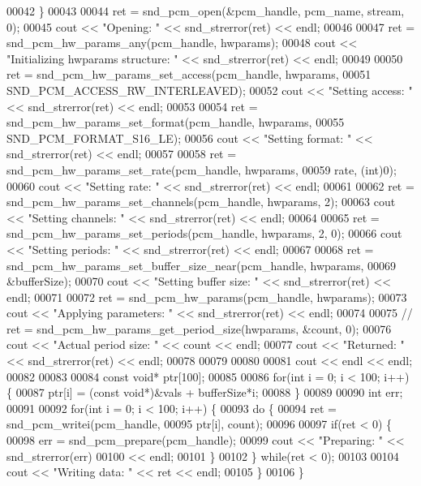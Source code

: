\begin{DoxyCode}
00042     \}
00043 
00044     ret = snd\_pcm\_open(&pcm\_handle, pcm\_name, stream, 0);
00045     cout << \textcolor{stringliteral}{"Opening: "} << snd\_strerror(ret) << endl;
00046 
00047     ret = snd\_pcm\_hw\_params\_any(pcm\_handle, hwparams);
00048     cout << \textcolor{stringliteral}{"Initializing hwparams structure: "} << snd\_strerror(ret) << endl;   
00049 
00050     ret = snd\_pcm\_hw\_params\_set\_access(pcm\_handle, hwparams,
00051             SND\_PCM\_ACCESS\_RW\_INTERLEAVED);
00052     cout << \textcolor{stringliteral}{"Setting access: "} << snd\_strerror(ret) << endl;
00053 
00054     ret = snd\_pcm\_hw\_params\_set\_format(pcm\_handle, hwparams,
00055             SND\_PCM\_FORMAT\_S16\_LE);
00056     cout << \textcolor{stringliteral}{"Setting format: "} << snd\_strerror(ret) << endl;
00057 
00058     ret = snd\_pcm\_hw\_params\_set\_rate(pcm\_handle, hwparams,
00059             rate, (\textcolor{keywordtype}{int})0);
00060     cout << \textcolor{stringliteral}{"Setting rate: "} << snd\_strerror(ret) << endl;
00061 
00062     ret = snd\_pcm\_hw\_params\_set\_channels(pcm\_handle, hwparams, 2); 
00063     cout << \textcolor{stringliteral}{"Setting channels: "} << snd\_strerror(ret) << endl;
00064 
00065     ret = snd\_pcm\_hw\_params\_set\_periods(pcm\_handle, hwparams, 2, 0);
00066     cout << \textcolor{stringliteral}{"Setting periods: "} << snd\_strerror(ret) << endl;
00067 
00068     ret = snd\_pcm\_hw\_params\_set\_buffer\_size\_near(pcm\_handle, hwparams,
00069             &bufferSize);
00070     cout << \textcolor{stringliteral}{"Setting buffer size: "} << snd\_strerror(ret) << endl;
00071 
00072     ret = snd\_pcm\_hw\_params(pcm\_handle, hwparams);
00073     cout << \textcolor{stringliteral}{"Applying parameters: "} << snd\_strerror(ret) << endl;
00074 
00075 \textcolor{comment}{//  ret = snd\_pcm\_hw\_params\_get\_period\_size(hwparams, &count, 0);}
00076     cout << \textcolor{stringliteral}{"Actual period size: "} << count << endl;
00077     cout << \textcolor{stringliteral}{"Returned: "} << snd\_strerror(ret) << endl;
00078 
00079 
00080 
00081     cout << endl << endl;
00082 
00083 
00084     \textcolor{keyword}{const} \textcolor{keywordtype}{void}* ptr[100];
00085 
00086     \textcolor{keywordflow}{for}(\textcolor{keywordtype}{int} i = 0; i < 100; i++) \{
00087         ptr[i] = (\textcolor{keyword}{const} \textcolor{keywordtype}{void}*)&vals + bufferSize*i;
00088     \}
00089 
00090     \textcolor{keywordtype}{int} err;
00091 
00092     \textcolor{keywordflow}{for}(\textcolor{keywordtype}{int} i = 0; i < 100; i++) \{
00093         \textcolor{keywordflow}{do} \{
00094             ret = snd\_pcm\_writei(pcm\_handle,
00095                     ptr[i], count);
00096 
00097             \textcolor{keywordflow}{if}(ret < 0) \{
00098                 err = snd\_pcm\_prepare(pcm\_handle);
00099                 cout << \textcolor{stringliteral}{"Preparing: "} << snd\_strerror(err)
00100                     << endl;
00101             \}
00102         \} \textcolor{keywordflow}{while}(ret < 0);
00103 
00104         cout << \textcolor{stringliteral}{"Writing data: "} << ret << endl;
00105     \}
00106 \}
\end{DoxyCode}
